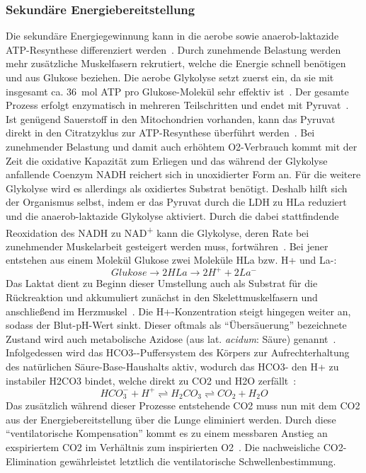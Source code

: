 \subsubsection{Sekundäre Energiebereitstellung}
%
Die sekundäre Energiegewinnung kann in die aerobe sowie anaerob-laktazide ATP-Resynthese differenziert werden~\cite{Kroidl.2015}. Durch zunehmende Belastung werden mehr zusätzliche Muskelfasern rekrutiert, welche die Energie schnell benötigen und aus Glukose beziehen. Die aerobe Glykolyse setzt zuerst ein, da sie mit insgesamt ca. \SI{36}{\mole} ATP pro Glukose-Molekül sehr effektiv ist~\cite{Kroidl.2015}. Der gesamte Prozess erfolgt enzymatisch in mehreren Teilschritten und endet mit Pyruvat~\cite{Heck.2006}. Ist genügend Sauerstoff in den Mitochondrien vorhanden, kann das Pyruvat direkt in den Citratzyklus zur ATP-Resynthese überführt werden~\cite{Rassow.2008}. Bei zunehmender Belastung und damit auch erhöhtem \gls{O2}-Verbrauch kommt mit der Zeit die oxidative Kapazität zum Erliegen und das während der Glykolyse anfallende Coenzym \gls{NADH} reichert sich in unoxidierter Form an. Für die weitere Glykolyse wird es allerdings als oxidiertes Substrat benötigt. Deshalb hilft sich der Organismus selbst, indem er das Pyruvat durch die \gls{LDH} zu \gls{HLa} reduziert~\cite{Rassow.2008} und die anaerob-laktazide Glykolyse aktiviert. Durch die dabei stattfindende Reoxidation des \gls{NADH} zu NAD\textsuperscript{+} kann die Glykolyse, deren Rate bei zunehmender Muskelarbeit gesteigert werden muss, fortwähren~\cite{Heck.2006}. Bei jener entstehen aus einem Molekül Glukose zwei Moleküle \gls{HLa} bzw. \gls{H+} und \gls{La-}:
%
\begin{equation}
Glukose \rightarrow 2 HLa \rightarrow 2 H^+ + 2 La^-
\label{eq:formel4}
\end{equation}
%
Das Laktat dient zu Beginn dieser Umstellung auch als Substrat für die Rückreaktion und akkumuliert zunächst in den Skelettmuskelfasern und anschließend im Herzmuskel~\cite{Klinke.2003}. Die \gls{H+}-Konzentration steigt hingegen weiter an, sodass der Blut-pH-Wert sinkt. Dieser oftmals als "`Übersäuerung"' bezeichnete Zustand wird auch metabolische Azidose (aus lat. \textsl{acidum}: Säure) genannt~\cite{Boening.2008}. Infolgedessen wird das \gls{HCO3-}-Puffersystem des Körpers zur Aufrechterhaltung des natürlichen Säure-Base-Haushalts aktiv, wodurch das \gls{HCO3-} den \gls{H+} zu instabiler \gls{H2CO3} bindet, welche direkt zu \gls{CO2} und \gls{H2O} zerfällt~\cite{Kroidl.2015}:
%
\begin{equation}
HCO_3^- + H^+ \rightleftharpoons H_2CO_3 \rightleftharpoons CO_2 + H_2O
\label{eq:formel5}
\end{equation}
%
Das zusätzlich während dieser Prozesse entstehende \gls{CO2} muss nun mit dem \gls{CO2} aus der Energiebereitstellung über die Lunge eliminiert werden. Durch diese "`ventilatorische Kompensation"' kommt es zu einem messbaren Anstieg an exspiriertem \gls{CO2} im Verhältnis zum inspirierten \gls{O2}~\cite{Boening.2008}. Die nachweisliche \gls{CO2}-Elimination gewährleistet letztlich die ventilatorische Schwellenbestimmung.
%
